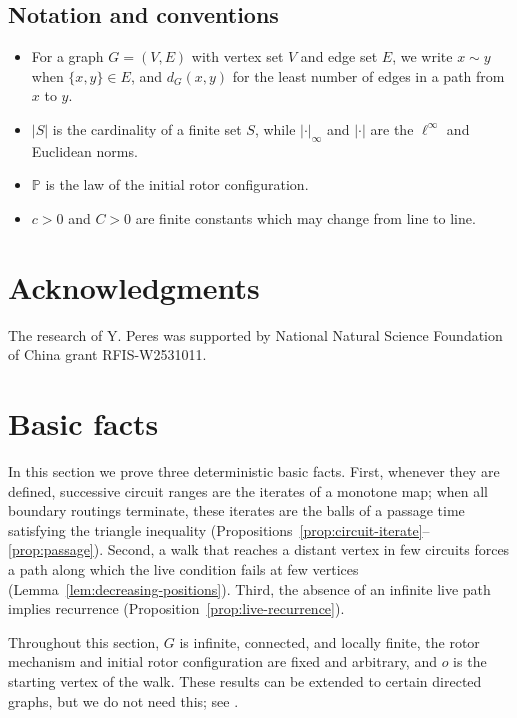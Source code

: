 \documentclass[11pt]{amsart}
\theoremstyle{plain}
\theoremstyle{definition}
\renewcommand{\P}{\mathbb P}
\begin{document}
	\subsection{Notation and conventions}
	
	\begin{itemize}
		\item For a graph $G=(V,E)$ with vertex set $V$ and edge set $E$, we write
		$x\sim y$ when $\{x,y\}\in E$, and $d_G(x,y)$ for the least number of edges
		in a path from $x$ to $y$.
		\item $|S|$ is the cardinality of a finite set $S$, while $|\cdot|_\infty$
		and $|\cdot|$ are the $\ell^\infty$ and Euclidean norms.
		\item $\P$ is the law of the initial rotor configuration.
		\item $c>0$ and $C>0$ are finite constants which may change from line to
		line.
	\end{itemize}
	
	\section*{Acknowledgments}
	The research of Y. Peres was supported by National Natural Science Foundation of China grant
	RFIS-W2531011.
	
	
	\section{Basic facts}\label{sec:circuits}
	In this section we prove three deterministic basic facts.  First, whenever
	they are defined, successive circuit ranges are the iterates of a monotone
	map; when all boundary routings terminate, these iterates are the balls of a
	passage time satisfying the triangle inequality
	(Propositions~\ref{prop:circuit-iterate}--\ref{prop:passage}).  Second, a walk
	that reaches a distant vertex in few circuits forces a path along which the
	live condition fails at few vertices
	(Lemma~\ref{lem:decreasing-positions}).  Third, the absence of an infinite
	live path implies recurrence (Proposition~\ref{prop:live-recurrence}).
	
	
	Throughout this section, $G$ is infinite, connected, and locally finite, the
	rotor mechanism and initial rotor configuration are fixed and arbitrary, and $o$ is the
	starting vertex of the walk. These results can be extended to certain directed graphs, but we do not need this; see
	\citet{HolroydLevineMeszarosPeresProppWilson2008}.
	
\end{document}

